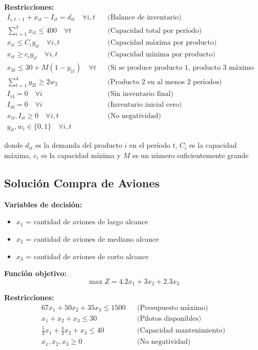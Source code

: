 \documentclass[12pt]{article}
\begin{document}
\textbf{Restricciones:}
\begin{align*}
    I_{i,t-1} + x_{it} - I_{it} = d_{it} \quad \forall i,t && \text{(Balance de inventario)} \\
    \sum_{i=1}^{3} x_{it} \leq 400 \quad \forall t && \text{(Capacidad total por período)} \\
    x_{it} \leq C_i y_{it} \quad \forall i,t && \text{(Capacidad máxima por producto)} \\
    x_{it} \geq c_i y_{it} \quad \forall i,t && \text{(Capacidad mínima por producto)} \\
    x_{3t} \leq 30 + M(1-y_{1t}) \quad \forall t && \text{(Si se produce producto 1, producto 3 máximo 30)} \\
    \sum_{t=1}^{4} y_{2t} \geq 2w_2 && \text{(Producto 2 en al menos 2 períodos)} \\
    I_{i4} = 0 \quad \forall i && \text{(Sin inventario final)} \\
    I_{i0} = 0 \quad \forall i && \text{(Inventario inicial cero)} \\
    x_{it}, I_{it} \geq 0 \quad \forall i,t && \text{(No negatividad)} \\
    y_{it}, w_i \in \{0,1\} \quad \forall i,t
\end{align*}
\begin{center}
donde $d_{it}$ es la demanda del producto $i$ en el período $t$, $C_i$ es la capacidad máxima, $c_i$ es la capacidad mínima y $M$ es un número suficientemente grande
\end{center}

\subsection{Solución Compra de Aviones}

\textbf{Variables de decisión:}
\begin{itemize}
    \item $x_1$ = cantidad de aviones de largo alcance
    \item $x_2$ = cantidad de aviones de mediano alcance
    \item $x_3$ = cantidad de aviones de corto alcance
\end{itemize}

\textbf{Función objetivo:}
$$\max Z = 4.2x_1 + 3x_2 + 2.3x_3$$

\textbf{Restricciones:}
\begin{align*}
    67x_1 + 50x_2 + 35x_3 \leq 1500 && \text{(Presupuesto máximo)} \\
    x_1 + x_2 + x_3 \leq 30 && \text{(Pilotos disponibles)} \\
    \frac{5}{3}x_1 + \frac{4}{3}x_2 + x_3 \leq 40 && \text{(Capacidad mantenimiento)} \\
    x_1, x_2, x_3 \geq 0 && \text{(No negatividad)}
\end{align*}
\end{document}

